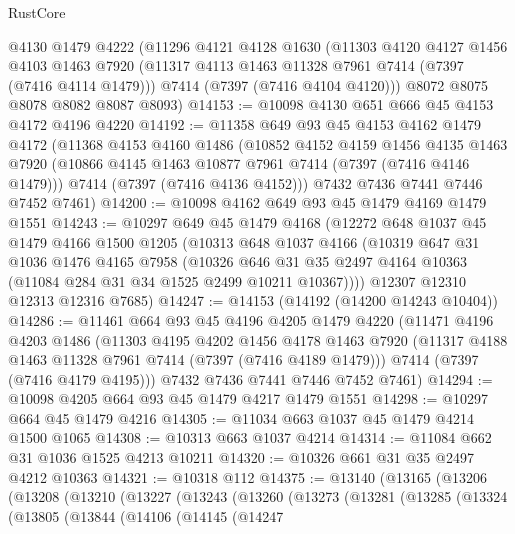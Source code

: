 \begin{lexlean}{RustCore}
\begin{coremodule}
    @4130
    @1479
    @4222
    (@11296
      @4121
      @4128
      @1630
      (@11303
        @4120
        @4127
        @1456
        @4103
        @1463
        @7920
        (@11317 @4113 @1463 @11328 @7961 @7414 (@7397 (@7416 @4114 @1479)))
        @7414
        (@7397 (@7416 @4104 @4120)))
      @8072
      @8075
      @8078
      @8082
      @8087
      @8093)
@14153 := @10098 @4130 @651 @666 @45 @4153 @4172 @4196 @4220
@14192 := @11358
    @649
    @93
    @45
    @4153
    @4162
    @1479
    @4172
    (@11368
      @4153
      @4160
      @1486
      (@10852
        @4152
        @4159
        @1456
        @4135
        @1463
        @7920
        (@10866 @4145 @1463 @10877 @7961 @7414 (@7397 (@7416 @4146 @1479)))
        @7414
        (@7397 (@7416 @4136 @4152)))
      @7432
      @7436
      @7441
      @7446
      @7452
      @7461)
@14200 := @10098 @4162 @649 @93 @45 @1479 @4169 @1479 @1551
@14243 := @10297
    @649
    @45
    @1479
    @4168
    (@12272
      @648
      @1037
      @45
      @1479
      @4166
      @1500
      @1205
      (@10313
        @648
        @1037
        @4166
        (@10319
          @647
          @31
          @1036
          @1476
          @4165
          @7958
          (@10326 @646 @31 @35 @2497 @4164 @10363 (@11084 @284 @31 @34 @1525 @2499 @10211 @10367))))
      @12307
      @12310
      @12313
      @12316
      @7685)
@14247 := @14153 (@14192 (@14200 @14243 @10404))
@14286 := @11461
    @664
    @93
    @45
    @4196
    @4205
    @1479
    @4220
    (@11471
      @4196
      @4203
      @1486
      (@11303
        @4195
        @4202
        @1456
        @4178
        @1463
        @7920
        (@11317 @4188 @1463 @11328 @7961 @7414 (@7397 (@7416 @4189 @1479)))
        @7414
        (@7397 (@7416 @4179 @4195)))
      @7432
      @7436
      @7441
      @7446
      @7452
      @7461)
@14294 := @10098 @4205 @664 @93 @45 @1479 @4217 @1479 @1551
@14298 := @10297 @664 @45 @1479 @4216
@14305 := @11034 @663 @1037 @45 @1479 @4214 @1500 @1065
@14308 := @10313 @663 @1037 @4214
@14314 := @11084 @662 @31 @1036 @1525 @4213 @10211
@14320 := @10326 @661 @31 @35 @2497 @4212 @10363
@14321 := @10318 @112
@14375 := @13140
    (@13165
      (@13206
        (@13208
          (@13210
            (@13227
              (@13243
                (@13260
                  (@13273
                    (@13281
                      (@13285
                        (@13324
                          (@13805
                            (@13844
                              (@14106
                                (@14145
                                  (@14247

\end{coremodule}
\end{lexlean}
